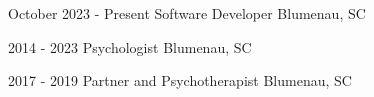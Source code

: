 
{October 2023 - Present}
{Software Developer}
{Blumenau, SC}

{2014 - 2023}
{Psychologist}
{Blumenau, SC}

{2017 - 2019}
{Partner and Psychotherapist}
{Blumenau, SC}
